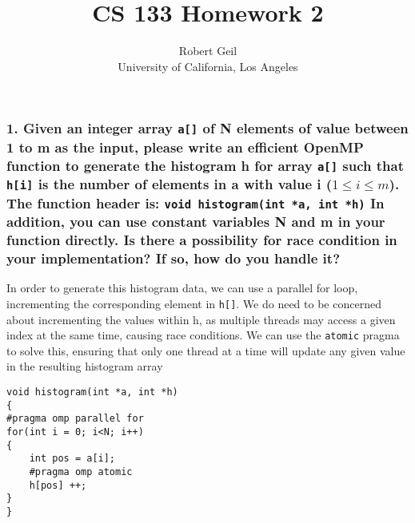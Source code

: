\documentclass[titlepage]{article}
\title{CS 133 Homework 2}
\author{Robert Geil \\ University of California, Los Angeles}
\def\code#1{\texttt{#1}}
\begin{document}
\maketitle
\subsubsection*{1. Given an integer array \code{a[]} of N elements of value between
1 to m as the input, please write an efficient OpenMP function to generate 
the histogram h for array \code{a[]} such that \code{h[i]} is the number of elements in a 
with value i ($1 \leq i \leq m$). The function header is: 
\code{void histogram(int *a, int *h)} In addition, you can use constant 
variables N and m in your function directly. Is there a possibility for race
condition in your implementation? If so, how do you handle it?}
In order to generate this histogram data, we can use a parallel for loop,
incrementing the corresponding element in \code{h[]}. We do need to be concerned
about incrementing the values within h, as multiple threads may access a given
index at the same time, causing race conditions. We can use the \code{atomic}
pragma to solve this, ensuring that only one thread at a time will update any
given value in the resulting histogram array
\begin{lstlisting}[style=CStyle]
void histogram(int *a, int *h)
{
#pragma omp parallel for
for(int i = 0; i<N; i++)
{
    int pos = a[i];
    #pragma omp atomic
    h[pos] ++;
}
}
\end{lstlisting}
\end{document}
